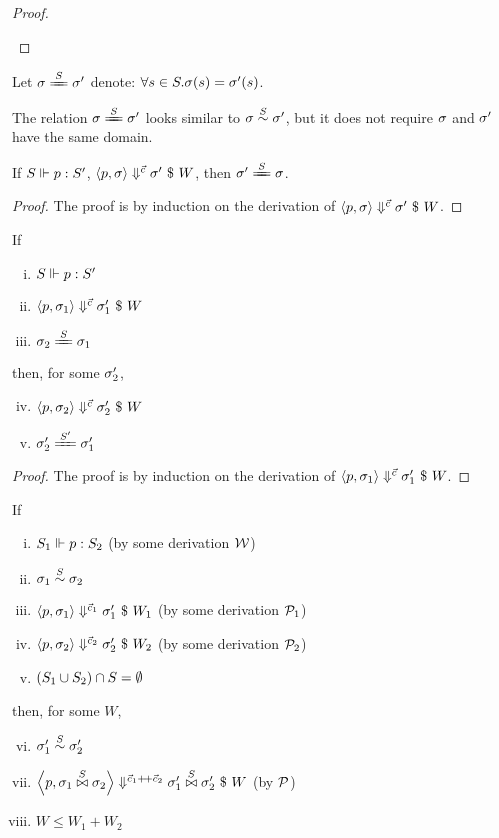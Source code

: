\begin{proof}
\begin{itemize}
	\end{itemize}
	
\end{proof}

\begin{nota}
Let $\sgm \ConEq{\S} \sgm'$ denote: $\forall s \in \S. \sgm(s) = \sgm'(s)$.
\end{nota}
The relation $\sgm \ConEq{\S} \sgm'$ looks similar to $\sgm \~{\S} \sgm'$, but it does not require $\sgm$ and $\sgm'$ have the same domain.

\begin{lem}\label{lem-}
	If $\wf{p}{\S}{\S'}$, $\seval{p}{\sgm}{\c}{\sgm'}{W}$, then $\sgm' \ConEq{\S} \sgm$.
\end{lem}
\begin{proof}
	The proof is by induction on the derivation of $\seval{p}{\sgm}{\c}{\sgm'}{W}$.
\end{proof}


\begin{lem} \label{lem-emp-join}
	If 
	\begin{enumerate} [(i)]
		\item $\wf{p}{\S}{\S'}$
		\item $\seval{p}{\sgm_1}{\c}{\sgm_1'}{W}$
		\item $\sgm_2 \ConEq{S} \sgm_1$
	\end{enumerate}
	then, for some $\sgm_2'$,  
	\begin{enumerate}[(i)]
		\setcounter{enumi}{3}
		\item $\seval{p}{\sgm_2}{\c}{\sgm_2'}{W}$
		\item $\sgm_2' \ConEq{\S'} \sgm_1'$
	\end{enumerate}
\end{lem}
\begin{proof}
	The proof is by induction on the derivation of $\seval{p}{\sgm_1}{\c}{\sgm_1'}{W}$. 
\end{proof}


\begin{lem}  \label{lem-sgm-join}
	If 
	\begin{enumerate}[(i)]
		\item $\wf{p}{\S_1}{\S_2}$ (by some derivation $\MW$)
		\item $\sgm_1 \~{\S} \sgm_2$
		\item $\seval{p}{\sgm_1}{\c_1}{\sgm_1'}{W_1}$ (by some derivation $\MP_1$)
		\item $	\seval{p}{\sgm_2} {\c_2} {\sgm_2'}{W_2}$ (by some derivation $\MP_2$)
		\item $(\S_1 \cup \S_2) \cap \S = \emptyset $
	\end{enumerate}
	then, for some $W$, 
	\begin{enumerate}[(i)]
		\setcounter{enumi}{5}
		\item $\sgm_1' \~\S \sgm_2'$
		\item $\seval{p}{\sgm_1 \x\S \sgm_2}{\c_1 {\++} \c_2}{ \sgm_1' \x\S \sgm_2' }{W}$ (by $\MP$)
		\item $W \le W_1 + W_2$
	\end{enumerate}
\end{lem}

